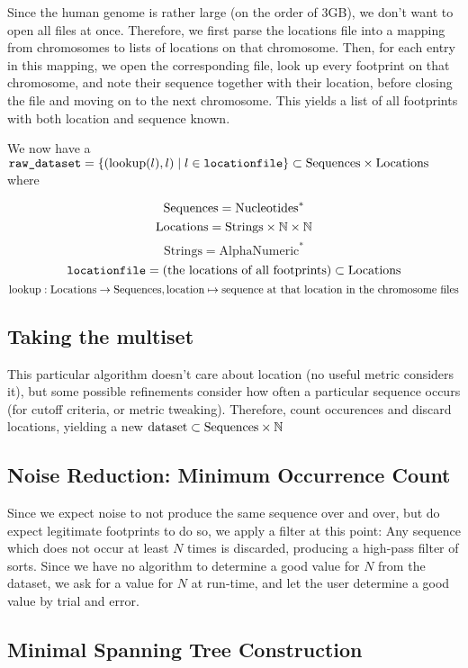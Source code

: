 \documentclass[fleqn]{book}
\begin{document}
Since the human genome is rather large (on the order of 3GB), we don't
want to open all files at once. Therefore, we first parse the locations
file into a mapping from chromosomes to lists of locations on that
chromosome. Then, for each entry in this mapping, we open the
corresponding file, look up every footprint on that chromosome, and note
their sequence together with their location, before closing the file and
moving on to the next chromosome. This yields a list of all footprints
with both location and sequence known.

We now have a
\(\texttt{raw\_dataset} = \{(\operatorname{lookup}(l), l) \mid l \in \texttt{locationfile} \} \subset \text{Sequences} \times \text{Locations}\)
where

\[\text{Sequences} = \text{Nucleotides}^*\]
\[\text{Locations} = \text{Strings} \times \mathbb{N} \times \mathbb{N}\]
\[\text{Strings} = \text{AlphaNumeric}^*\]
\[\texttt{locationfile} = \text{(the locations of all footprints)} \subset \text{Locations}\]
\[\operatorname{lookup} : \text{Locations} \rightarrow \text{Sequences}, \text{location} \mapsto \text{sequence at that location in the chromosome files}\]

\subsection{Taking the multiset}\label{taking-the-multiset}

This particular algorithm doesn't care about location (no useful metric
considers it), but some possible refinements consider how often a
particular sequence occurs (for cutoff criteria, or metric tweaking).
Therefore, count occurences and discard locations, yielding a new
\(\text{dataset} \subset \text{Sequences} \times \mathbb{N}\)

\subsection{Noise Reduction: Minimum Occurrence
Count}\label{noise-reduction-minimum-occurrence-count}

Since we expect noise to not produce the same sequence over and over,
but do expect legitimate footprints to do so, we apply a filter at this
point: Any sequence which does not occur at least \(N\) times is
discarded, producing a high-pass filter of sorts. Since we have no
algorithm to determine a good value for \(N\) from the dataset, we ask
for a value for \(N\) at run-time, and let the user determine a good
value by trial and error.

\subsection{Minimal Spanning Tree
Construction}\label{minimal-spanning-tree-construction}
\end{document}
